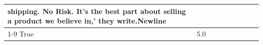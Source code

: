 \begin{table}[H]
{\begin{tabular}{lllrlllll}
shipping. No Risk. It’s the best part about selling a product we believe in,' they write.Newline \\
\cline{1-9}
True & 5.0%

\end{tabular}}
\end{table}
